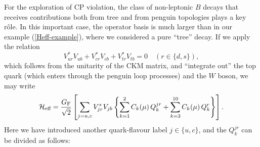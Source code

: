 \documentclass[11pt]{cernrep}
\begin{document}
For the exploration of CP violation, the class of non-leptonic $B$ decays 
that receives contributions both from tree and from penguin topologies plays 
a key r\^ole. In this important case, the operator basis is much larger 
than in our example (\ref{Heff-example}), where we considered a pure 
``tree'' decay. If we apply the relation
\begin{equation}\label{CKM-UT-Rel}
V_{ur}^\ast V_{ub}+V_{cr}^\ast V_{cb}+V_{tr}^\ast V_{tb}=0
\quad (r\in\{d,s\}),
\end{equation}
which follows from the unitarity of the CKM matrix, and ``integrate out''
the top quark (which enters through the penguin loop processes) and 
the $W$ boson, we may write 
\begin{equation}\label{e4}
{\cal H}_{\mbox{{\scriptsize eff}}}=\frac{G_{\mbox{{\scriptsize 
F}}}}{\sqrt{2}}\left[\sum\limits_{j=u,c}V_{jr}^\ast V_{jb}\left\{
\sum\limits_{k=1}^2C_k(\mu)\,Q_k^{jr}
+\sum\limits_{k=3}^{10}C_k(\mu)\,Q_k^{r}\right\}\right].
\end{equation}
Here we have introduced another quark-flavour label $j\in\{u,c\}$,
and the $Q_k^{jr}$ can be divided as follows:
\end{document}
